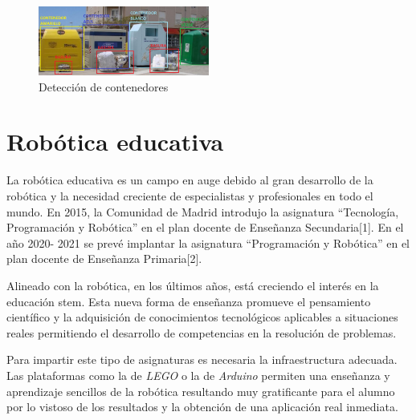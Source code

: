 \begin{figure}[H]
  \begin{center}
    \includegraphics[width=0.5\textwidth]{figures/introduccion/contenedor.png}
		\caption{Detección de contenedores}
		\label{fig.contenedor}
		\end{center}
\end{figure}


\section{Robótica educativa}
La robótica educativa es un campo en auge debido al gran desarrollo de la robótica y la necesidad creciente de especialistas y profesionales en todo el mundo. En 2015, la Comunidad de Madrid introdujo la asignatura “Tecnología, Programación y Robótica” en el plan docente de Enseñanza Secundaria[1]. En el año 2020- 2021 se prevé implantar la asignatura “Programación y Robótica” en el plan docente de Enseñanza Primaria[2]. 

Alineado con la robótica, en los últimos años, está creciendo el interés en la educación \acrfull{stem}. Esta nueva forma de enseñanza promueve el pensamiento científico y la adquisición de conocimientos tecnológicos aplicables a situaciones reales permitiendo el desarrollo de competencias en la resolución de problemas.

Para impartir este tipo de asignaturas es necesaria la infraestructura adecuada. Las plataformas como la de \textit{LEGO} o la de \textit{Arduino} permiten una enseñanza y aprendizaje sencillos de la robótica resultando muy gratificante para el alumno por lo vistoso de los resultados y la obtención de una aplicación real inmediata.\\

